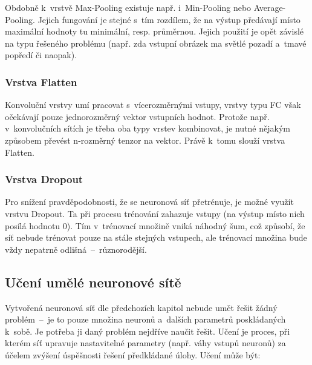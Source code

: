 \documentclass[a4paper,12pt]{article}
\begin{document}
{{{{{Obdobně k~vrstvě Max-Pooling existuje např. i~Min-Pooling nebo Average-Pooling. Jejich fungování je stejné s~tím rozdílem, že na výstup předávají místo maximální hodnoty tu minimální, resp. průměrnou. Jejich použití je opět závislé na typu řešeného problému (např. zda vstupní obrázek ma světlé pozadí a~tmavé popředí či naopak).~\cite{keras}

\subsubsection{Vrstva Flatten}

Konvoluční vrstvy umí pracovat s~vícerozměrnými vstupy, vrstvy typu FC však očekávají pouze jednorozměrný vektor vstupních hodnot. Protože např. v~konvolučních sítích je třeba oba typy vrstev kombinovat, je nutné nějakým způsobem převést n-rozměrný tenzor na vektor. Právě k~tomu slouží vrstva Flatten.~\cite{keras}

\drawgimp

\subsubsection{Vrstva Dropout}

Pro snížení pravděpodobnosti, že se neuronová síť přetrénuje, je možné využít vrstvu Dropout. Ta při procesu trénování zahazuje vstupy (na výstup místo nich posílá hodnotu 0). Tím v~trénovací množině vniká náhodný šum, což způsobí, že síť nebude trénovat pouze na stále stejných vstupech, ale trénovací množina bude vždy nepatrně odlišná~--~různorodější.~\cite{keras}


{

\subsection{Učení umělé neuronové sítě}

Vytvořená neuronová síť dle předchozích kapitol nebude umět řešit žádný problém~--~je to pouze množina neuronů a~dalších parametrů poskládaných k~sobě. Je potřeba ji daný problém nejdříve naučit řešit. Učení je proces, při kterém síť upravuje nastavitelné parametry (např. váhy vstupů neuronů) za účelem zvýšení úspěšnosti řešení předkládané úlohy. Učení může být:


}}}}}}
\end{document}
